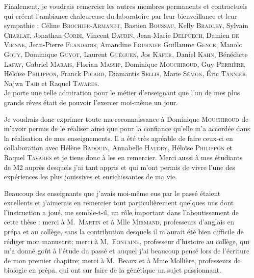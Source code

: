 Finalement, je voudrais remercier les autres membres permanents et contractuels qui créent l'ambiance chaleureuse du laboratoire par leur bienveillance et leur sympathie : 
Céline \textsc{Brochier-Armanet},
Bastien \textsc{Boussau},
Kelly \textsc{Bradley},
Sylvain \textsc{Charlat},
Jonathan \textsc{Corbi},
Vincent \textsc{Daubin},
Jean-Marie \textsc{Delpuech},
Damien \textsc{de Vienne},
Jean-Pierre \textsc{Flandrois},
Amandine \textsc{Fournier}
Guillaume \textsc{Gence},
Manolo \textsc{Gouy},
Dominique \textsc{Guyot},
Laurent \textsc{Guéguen},
Jos \textsc{Käfer},
Daniel \textsc{Kahn},
Bénédicte \textsc{Lafay},
Gabriel \textsc{Marais},
Florian \textsc{Massip},
Dominique \textsc{Mouchiroud},
Guy \textsc{Perrière},
Héloïse \textsc{Philippon},
Franck \textsc{Picard},
Diamantis \textsc{Sellis},
Marie \textsc{Sémon},
\'Eric \textsc{Tannier},
Najwa \textsc{Taib} et
Raquel \textsc{Tavares}.\\




%




Je porte une telle admiration pour le métier d'enseignant que l'un de mes plus grands rêves était de pouvoir l'exercer moi-même un jour.

Je voudrais donc exprimer toute ma reconnaissance à Dominique \textsc{Mouchiroud} de m'avoir permis de le réaliser ainsi que pour la confiance qu'elle m'a accordée dans la réalisation de mes enseignements.
Il a été très agréable de faire ceux-ci en collaboration avec Hélène \textsc{Badouin}, Annabelle \textsc{Haudry}, Héloïse \textsc{Philippon} et Raquel \textsc{Tavares} et je tiens donc à les en remercier.
Merci aussi à mes étudiants de M2 auprès desquels j'ai tant appris et qui m'ont permis de vivre l'une des expériences les plus jouissives et enrichissantes de ma vie.

Beaucoup des enseignants que j'avais moi-même eus par le passé étaient excellents et j'aimerais en remercier tout particulièrement quelques uns dont l'instruction a joué, me semble-t-il, un rôle important dans l'aboutissement de cette thèse : 
merci à M.\ \textsc{Martin} et à Mlle \textsc{Mirmand}, professeurs d'anglais en prépa et au collège, sans la contribution desquels il m'aurait été bien difficile de rédiger mon manuscrit; 
merci à M.\ \textsc{Fontaine}, professeur d'histoire au collège, qui m'a donné goût à l'étude du passé et auquel j'ai beaucoup pensé lors de l'écriture de mon premier chapitre; 
merci à M.\ Beaux et à Mme Mollière, professeurs de biologie en prépa, qui ont sur faire de la génétique un sujet passionnant.

